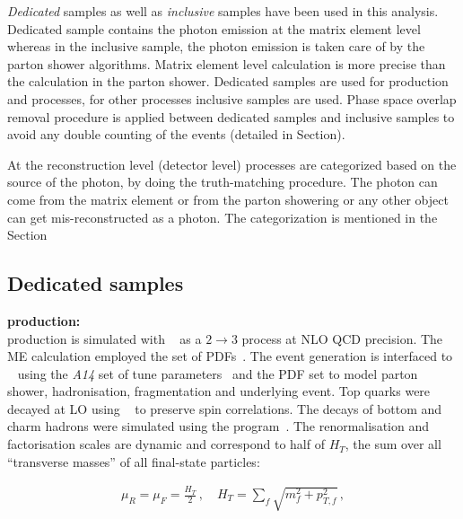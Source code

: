 \textit{Dedicated} samples as well as \textit{inclusive} samples have been used in this analysis. Dedicated sample contains the photon emission at the matrix element level whereas in the inclusive sample, the photon emission is taken care of by the parton shower algorithms. Matrix element level calculation is more precise than the calculation in the parton shower. Dedicated samples are used for \tty production and \vgamma processes, for other processes inclusive samples are used. Phase space overlap removal procedure is applied between dedicated samples and inclusive samples to avoid any double counting of the events (detailed in Section). %

At the reconstruction level (detector level) processes are categorized based on the source of the photon, by doing the truth-matching procedure. The photon can come from the matrix element or from the parton showering or any other object can get mis-reconstructed as a photon. The categorization is mentioned in the Section %

\subsection{Dedicated samples}
\label{sec:dedicated-samples}
\textbf{\tty production:}\\
\tty production is simulated with \MGNLO[2.7.3]~\cite{Alwall:2014hca} as a $2\to 3$ process at NLO QCD precision. The ME calculation employed the \NNPDF[3.0nlo] set of PDFs~\cite{Ball:2014uwa}. The event generation is interfaced to \PYTHIA[8.240]~\cite{Sjostrand:2007gs} using the \emph{A14} set of tune parameters~\cite{ATL-PHYS-PUB-2014-021} and the \nnpdflo PDF set to model parton shower, hadronisation, fragmentation and underlying event. Top quarks were decayed at LO using \MADSPIN~\cite{Frixione:2007zp,Artoisenet:2012st} to preserve spin correlations. The decays of bottom and charm hadrons were simulated using the \EVTGEN[1.6.0] program~\cite{Lange:2001uf}. The renormalisation and factorisation scales are dynamic and correspond to half of $H_{T}$, the sum over all \enquote{transverse masses} of all final-state particles:

\begin{align}\label{eq:HT}
  \mu_R = \mu_F = \frac{H_{T}}{2} \, , \quad 
  H_{T} = \sum_f \sqrt{ m_f^2 + p_{T,f}^2 } \, ,
\end{align}

